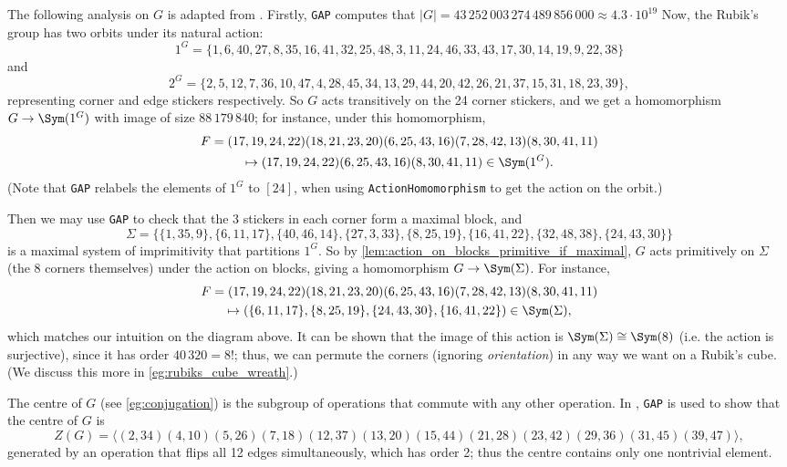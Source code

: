 \begin{example}
    The following analysis on $G$ is adapted from \cite{schonert_GAP}. Firstly, \texttt{GAP} computes that $|G| = 43\,252\,003\,274\,489\,856\,000 \approx 4.3 \cdot 10^{19}$ Now, the Rubik's group has two orbits under its natural action:
    \[1^G = \{ 1, 6, 40, 27, 8, 35, 16, 41, 32, 25, 48, 3, 11, 24, 46, 33, 43, 17, 30, 14, 19, 9, 22, 38 \}\]
    and
    \[2^G = \{ 2, 5, 12, 7, 36, 10, 47, 4, 28, 45, 34, 13, 29, 44, 20, 42, 26, 21, 37, 15, 31, 18, 23, 39 \},\]
    representing corner and edge stickers respectively. So $G$ acts transitively on the 24 corner stickers, and we get a homomorphism $G \to \Sym(1^G)$ with image of size $88\,179\,840$; for instance, under this homomorphism,
    \begin{multline*}
        F = (17,19,24,22)(18,21,23,20)( 6,25,43,16)( 7,28,42,13)( 8,30,41,11) \\
        \mapsto (17,19,24,22)( 6,25,43,16)( 8,30,41,11) \in \Sym(1^G).
    \end{multline*}
    (Note that \texttt{GAP} relabels the elements of $1^G$ to $[24]$, when using \texttt{ActionHomomorphism} to get the action on the orbit.)

    Then we may use \texttt{GAP} to check that the 3 stickers in each corner form a maximal block, and
    $$\Sigma = \{\{1,35,9\},\{6,11,17\},\{40,46,14\},\{27,3,33\},\{8,25,19\},\{16,41,22\},\{32,48,38\},\{24,43,30\}\}$$
    is a maximal system of imprimitivity that partitions $1^G$. So by \autoref{lem:action_on_blocks_primitive_if_maximal}, $G$ acts primitively on $\Sigma$ (the 8 corners themselves) under the action on blocks, giving a homomorphism $G \to \Sym(\Sigma)$. For instance,
    \begin{multline*}
        F = (17,19,24,22)(18,21,23,20)( 6,25,43,16)( 7,28,42,13)( 8,30,41,11) \\
        \mapsto (\{6,11,17\},\{8,25,19\},\{24,43,30\},\{16,41,22\}) \in \Sym(\Sigma),
    \end{multline*}
    which matches our intuition on the diagram above. It can be shown that the image of this action is $\Sym(\Sigma) \cong \Sym(8)$ (i.e. the action is surjective), since it has order $40\,320 = 8!$; thus, we can permute the corners (ignoring \textit{orientation}) in any way we want on a Rubik's cube. (We discuss this more in \autoref{eg:rubiks_cube_wreath}.)

    The centre of $G$ (see \autoref{eg:conjugation}) is the subgroup of operations that commute with any other operation. In \cite{schonert_GAP}, \texttt{GAP} is used to show that the centre of $G$ is
    $$Z(G) = \langle(2,34)(4,10)(5,26)(7,18)(12,37)(13,20)(15,44)(21,28)(23,42)(29,
        36)(31,45)(39,47)\rangle,$$
    generated by an operation that flips all 12 edges simultaneously, which has order 2; thus the centre contains only one nontrivial element.
\end{example}

